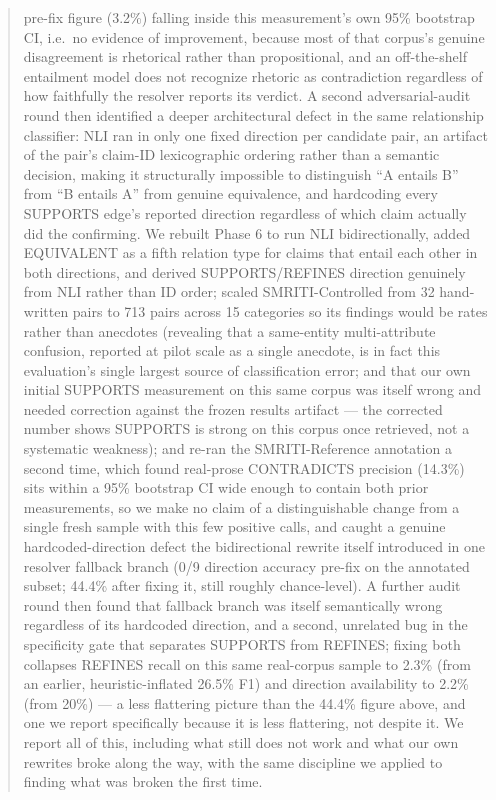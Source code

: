 \documentclass[11pt]{article}
\begin{document}
\begin{abstract}
pre-fix figure (3.2\%) falling inside this measurement's own 95\%
bootstrap CI, i.e.\ no evidence of improvement, because most of that
corpus's genuine disagreement is rhetorical rather than propositional,
and an off-the-shelf entailment model does not recognize rhetoric as
contradiction regardless of how faithfully the resolver reports its
verdict. A second adversarial-audit round then identified a deeper
architectural defect in the same relationship classifier: NLI ran in only
one fixed direction per candidate pair, an artifact of the pair's
claim-ID lexicographic ordering rather than a semantic decision, making
it structurally impossible to distinguish ``A entails B'' from ``B
entails A'' from genuine equivalence, and hardcoding every SUPPORTS
edge's reported direction regardless of which claim actually did the
confirming. We rebuilt Phase 6 to run NLI bidirectionally, added
EQUIVALENT as a fifth relation type for claims that entail each other in
both directions, and derived SUPPORTS/REFINES direction genuinely from
NLI rather than ID order; scaled SMRITI-Controlled from 32 hand-written
pairs to 713 pairs across 15 categories so its findings would be rates
rather than anecdotes (revealing that a same-entity multi-attribute
confusion, reported at pilot scale as a single anecdote, is in fact this
evaluation's single largest source of classification error; and that
our own initial SUPPORTS measurement on this same corpus was itself
wrong and needed correction against the frozen results artifact --- the
corrected number shows SUPPORTS is strong on this corpus once retrieved,
not a systematic weakness); and
re-ran the SMRITI-Reference annotation a second time, which found
real-prose CONTRADICTS precision (14.3\%) sits within a 95\% bootstrap CI
wide enough to contain both prior measurements, so we make no claim of a
distinguishable change from a single fresh sample with this few positive
calls, and caught a genuine hardcoded-direction defect the bidirectional
rewrite itself introduced in one resolver fallback branch (0/9 direction
accuracy pre-fix on the annotated subset; 44.4\% after fixing it, still
roughly chance-level). A further audit round then found
that fallback branch was itself semantically wrong regardless of its
hardcoded direction, and a second, unrelated bug in the specificity gate
that separates SUPPORTS from REFINES; fixing both collapses REFINES
recall on this same real-corpus sample to 2.3\% (from an earlier,
heuristic-inflated 26.5\% F1) and direction availability to 2.2\% (from
20\%) --- a less flattering picture than the 44.4\% figure above, and one
we report specifically because it is less flattering, not despite it. We
report all of this, including what still does not work and what our own
rewrites broke along the way, with the same discipline we applied to
finding what was broken the first time.
\end{abstract}
\end{document}
